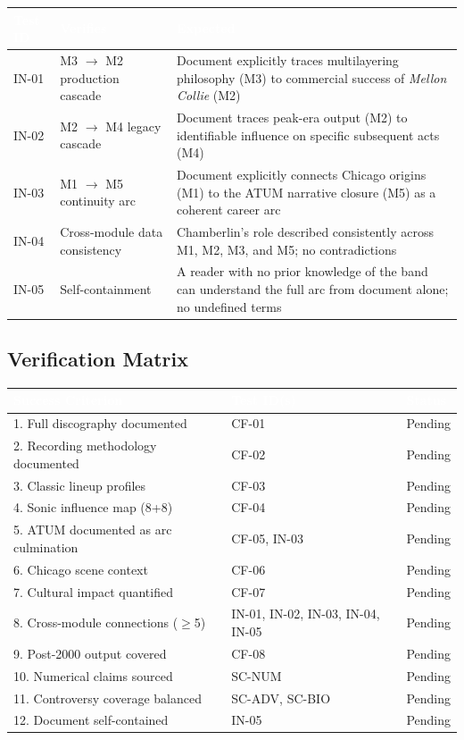 \documentclass[11pt,letterpaper]{article}
\newcommand{\tableheader}[1]{\textbf{\sffamily\textcolor{white}{#1}}}
\begin{document}
\begin{center}
\begin{tabularx}{\textwidth}{C{1.5cm}L{4cm}X}
\toprule
{}
\tableheader{Test ID} & \tableheader{Verifies} & \tableheader{Expected} \\
\midrule
IN-01 & M3 $\to$ M2 production cascade & Document explicitly traces multilayering philosophy (M3) to commercial success of \textit{Mellon Collie} (M2) \\
IN-02 & M2 $\to$ M4 legacy cascade & Document traces peak-era output (M2) to identifiable influence on specific subsequent acts (M4) \\
IN-03 & M1 $\to$ M5 continuity arc & Document explicitly connects Chicago origins (M1) to the ATUM narrative closure (M5) as a coherent career arc \\
IN-04 & Cross-module data consistency & Chamberlin's role described consistently across M1, M2, M3, and M5; no contradictions \\
IN-05 & Self-containment & A reader with no prior knowledge of the band can understand the full arc from document alone; no undefined terms \\
\bottomrule
\end{tabularx}
\end{center}

\subsection{Verification Matrix}

\begin{center}
\begin{tabularx}{\textwidth}{XL{3.5cm}C{1.5cm}}
\toprule
{}
\tableheader{Success Criterion} & \tableheader{Test ID(s)} & \tableheader{Status} \\
. Full discography documented & CF-01 & Pending \\
2. Recording methodology documented & CF-02 & Pending \\
3. Classic lineup profiles & CF-03 & Pending \\
4. Sonic influence map (8+8) & CF-04 & Pending \\
5. ATUM documented as arc culmination & CF-05, IN-03 & Pending \\
6. Chicago scene context & CF-06 & Pending \\
7. Cultural impact quantified & CF-07 & Pending \\
8. Cross-module connections ($\geq$5) & IN-01, IN-02, IN-03, IN-04, IN-05 & Pending \\
9. Post-2000 output covered & CF-08 & Pending \\
10. Numerical claims sourced & SC-NUM & Pending \\
11. Controversy coverage balanced & SC-ADV, SC-BIO & Pending \\
12. Document self-contained & IN-05 & Pending \\
\bottomrule
\end{tabularx}
\end{center}
\end{document}
